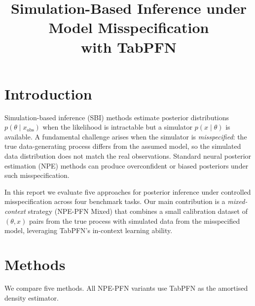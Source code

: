\documentclass[11pt]{article}
\title{Simulation-Based Inference under Model Misspecification\\with TabPFN}
\author{}
\date{}
\begin{document}
\maketitle

\section{Introduction}

Simulation-based inference (SBI) methods estimate posterior distributions
$p(\theta \mid x_{\mathrm{obs}})$ when the likelihood is intractable but a
simulator $p(x \mid \theta)$ is available.
A fundamental challenge arises when the simulator is \emph{misspecified}:
the true data-generating process differs from the assumed model, so the
simulated data distribution does not match the real observations.
Standard neural posterior estimation (NPE) methods can produce
overconfident or biased posteriors under such misspecification.

In this report we evaluate five approaches for posterior inference under
controlled misspecification across four benchmark tasks.
Our main contribution is a \emph{mixed-context} strategy
(NPE-PFN Mixed) that combines a small calibration dataset of
$(\theta, x)$ pairs from the true process with simulated data from the
misspecified model, leveraging TabPFN's in-context learning ability.

\section{Methods}

We compare five methods.  All NPE-PFN variants use TabPFN as the
amortised density estimator.
\end{document}
